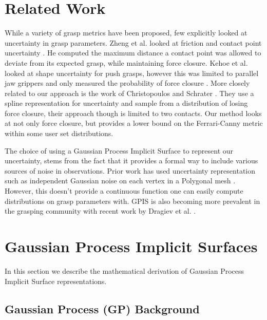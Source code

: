 \documentclass[letterpaper, 10 pt, conference]{ieeeconf}  %
\begin{document}
\section{Related Work}

While a variety of grasp metrics have been proposed, few explicitly looked at uncertainty in grasp parameters. Zheng et al. looked at friction and contact point uncertainty \cite{zheng2005}. He computed the maximum distance a contact point was allowed to deviate from its expected grasp, while maintaining force closure. Kehoe et al. looked at shape uncertainty for push grasps, however this was limited to parallel jaw grippers and only measured the probability of force closure \cite{kehoe2012toward}. More closely related to our approach is the work of Christopoulos and Schrater \cite{christopoulos2007handling}. They use a spline representation for uncertainty and sample from a distribution of losing force closure, their approach though is limited to two contacts. Our method looks at not only force closure, but provides a lower bound on the Ferrari-Canny metric within some user set distributions.  

The choice of using a Gaussian Process Implicit Surface to represent our uncertainty, stems from the fact that it provides a formal way to include various sources of noise in observations. Prior work has used uncertainty representation such as independent Gaussian noise on each vertex in a Polygonal mesh \cite{kehoe2012toward}. However, this doesn't provide a continuous function one can easily compute distributions on grasp parameters with. GPIS is also becoming more prevalent in the grasping community with recent work by Dragiev et al. \cite{dragiev2011} . 



\section{Gaussian Process Implicit Surfaces}

In this section we describe the mathematical derivation of Gaussian Process Implicit Surface representations.

\subsection{Gaussian Process (GP) Background}
\end{document}
